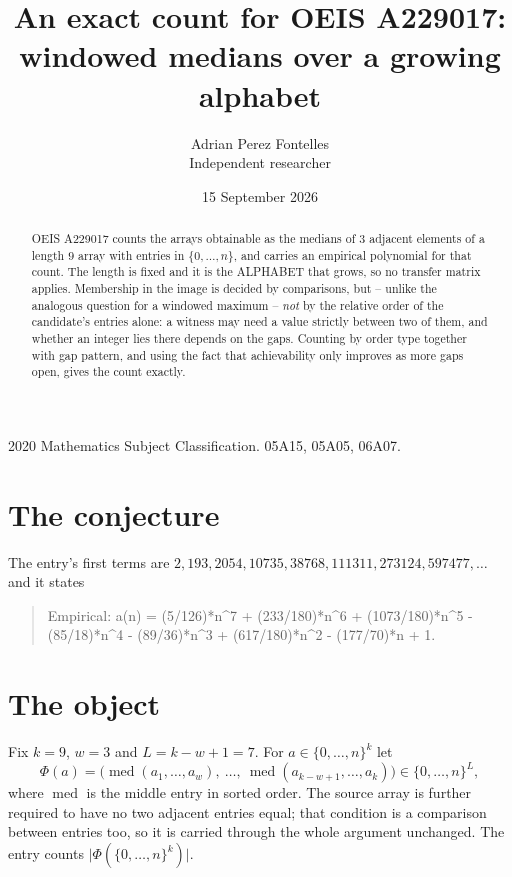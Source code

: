 \documentclass[11pt,a4paper]{article}
\title{An exact count for OEIS A229017: windowed medians over a growing alphabet}
\author{Adrian Perez Fontelles\\ \small Independent researcher}
\date{15 September 2026}
\theoremstyle{plain}
\theoremstyle{definition}
\begin{document}
\maketitle

\begin{abstract}
OEIS A229017 counts the arrays obtainable as the medians of $3$ adjacent elements of a length
$9$ array with entries in $\{0,\dots,n\}$, and carries an empirical polynomial for that
count. The length is fixed and it is the ALPHABET that grows, so no transfer matrix applies.
Membership in the image is decided by comparisons, but -- unlike the analogous question for a
windowed maximum -- \emph{not} by the relative order of the candidate's entries alone: a
witness may need a value strictly between two of them, and whether an integer lies there depends
on the gaps. Counting by order type together with gap pattern, and using the fact that
achievability only improves as more gaps open, gives the count exactly.
\end{abstract}

\noindent\small 2020 Mathematics Subject Classification. 05A15, 05A05, 06A07.\normalsize

\section{The conjecture}

The entry's first terms are $2, 193, 2054, 10735, 38768, 111311, 273124, 597477,\dots$ and it states

\begin{quote}\raggedright Empirical: a(n) = (5/126)*n\^{}7 + (233/180)*n\^{}6 + (1073/180)*n\^{}5 - (85/18)*n\^{}4 - (89/36)*n\^{}3 + (617/180)*n\^{}2 - (177/70)*n + 1.\end{quote}

\section{The object}

Fix $k=9$, $w=3$ and $L=k-w+1=7$. For $a\in\{0,\dots,n\}^k$ let
\[
  \Phi(a)=\bigl(\operatorname{med}(a_1,\dots,a_w),\ \dots,\
  \operatorname{med}(a_{k-w+1},\dots,a_k)\bigr)\in\{0,\dots,n\}^{L} ,
\]
where $\operatorname{med}$ is the middle entry in sorted order. The source array is further required to have no two adjacent entries equal; that condition is a comparison between entries too, so it is carried through the whole argument unchanged. The entry counts
$\lvert\Phi(\{0,\dots,n\}^k)\rvert$.
\end{document}
